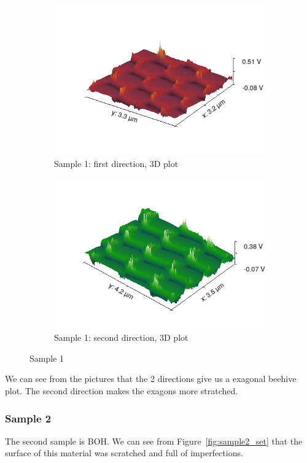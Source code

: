 \documentclass[11pt,a4paper]{article}
\begin{document}
\begin{figure}[H]
\begin{subfigure}[b]{0.45\textwidth}
\includegraphics[width=\textwidth]{sm_sample1_3D}
\caption{Sample 1: first direction, 3D plot}
\label{fig:}
\end{subfigure}
\begin{subfigure}[b]{0.45\textwidth}
\includegraphics[width=\textwidth]{sm_sample1_dir2_3D}
\caption{Sample 1: second direction, 3D plot}
\label{fig:}
\end{subfigure}
\caption{Sample 1}
\end{figure}

We can see from the pictures that the 2 directions give us a exagonal beehive plot. The second direction makes the exagons more stratched.%

\subsubsection{Sample 2}
The second sample is BOH. We can see from Figure~\ref{fig:sample2_set} that the surface of this material was scratched and full of imperfections.
\end{document}
